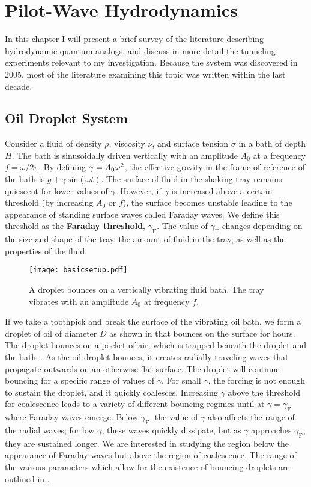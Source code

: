 \chapter{Pilot-Wave Hydrodynamics}
\label{Ch1}

In this chapter I will present a brief survey of the literature describing  hydrodynamic quantum analogs, and discuss in more detail the tunneling experiments relevant to my investigation. Because the system was discovered in 2005, most of the literature examining this topic was written within the last decade.


\section{Oil Droplet System}
	    \label{parameters}
	       Consider a fluid of density $\rho$, viscosity $\nu$, and surface tension $\sigma$ in a bath of depth $H$. The bath is sinusoidally driven vertically with an amplitude $A_0$ at a frequency $f=\omega/{2\pi}$. By defining $\mathnormal{\gamma}=A_0\omega^2$, the effective gravity in the frame of reference of the bath is $g+\gamma~\mathrm{sin}(\omega t)$. The surface of fluid in the shaking tray remains quiescent for lower values of $\gamma$. However, if  $\gamma$ is increased above a certain threshold (by increasing $A_0$ or $f$), the surface becomes unstable leading to the appearance of standing surface waves called Faraday waves. We define this threshold as the \textbf{Faraday threshold}, $\gamma_\mathrm{F}$. The value of $\gamma_\mathrm{F}$ changes depending on the size and shape of the tray, the amount of fluid in the tray, as well as the properties of the fluid. 
	       
	   \begin{figure}[h]
	       \centering
	    \texttt{[image: basicsetup.pdf]}
	     \caption{A droplet bounces on a vertically vibrating fluid bath. The tray vibrates with an amplitude $A_0$ at frequency $f$.}
	 \label{basic}
	\end{figure}
	       
	    If we take a toothpick and break the surface of the vibrating oil bath, we form a droplet of oil of diameter $D$ as shown in  that bounces on the surface for hours. The droplet bounces on a pocket of air, which is trapped beneath the droplet and the bath~. As the oil droplet bounces, it creates radially traveling waves that propagate outwards on an otherwise flat surface. The droplet will continue bouncing for a specific range of values of $\gamma$. For small $\gamma$, the forcing is not enough to sustain the droplet, and it quickly coalesces. Increasing $\gamma$ above the threshold for coalescence leads to a variety of different bouncing regimes until at $\gamma = \gamma_\mathrm{F}$ where Faraday waves emerge. Below $\gamma_\mathrm{F}$, the value of $\gamma$ also affects the range of the radial waves; for low $\gamma$, these waves quickly dissipate, but as $\gamma$ approaches $\gamma_\mathrm{F}$, they are sustained longer. We are interested in studying the region below the appearance of Faraday waves but above the region of coalescence. The range of the various parameters which allow for the existence of bouncing droplets are outlined in . 
	      
